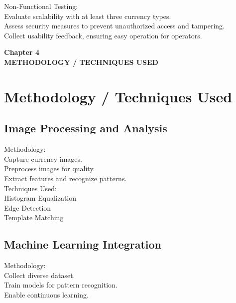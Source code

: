 \documentclass[12pt]{article}
\begin{document}
Non-Functional Testing:\\[0.5mm]
Evaluate scalability with at least three currency types.\\[0.5mm]
Assess security measures to prevent unauthorized access and tampering.\\[0.5mm]
Collect usability feedback, ensuring easy operation for operators.\\[0.5mm]

\clearpage

\begin{center}
 \LARGE \textbf {Chapter 4 }\\[10mm]
 \Large \textbf{METHODOLOGY / TECHNIQUES USED}\\[10mm]
 \end{center}
 \section{Methodology / Techniques Used}
 \subsection{ Image Processing and Analysis}
Methodology:\\[0.3mm]
Capture currency images.\\[0.3mm]
Preprocess images for quality.\\[0.3mm]
Extract features and recognize patterns.\\[0.3mm]

Techniques Used:\\[0.3mm]
Histogram Equalization\\[0.3mm]
Edge Detection\\[0.3mm]
Template Matching\\[0.3mm]

\subsection{Machine Learning Integration}
Methodology:\\[0.3mm]
Collect diverse dataset.\\[0.3mm]
Train models for pattern recognition.\\[0.3mm]
Enable continuous learning.\\[0.3mm]
\end{document}
